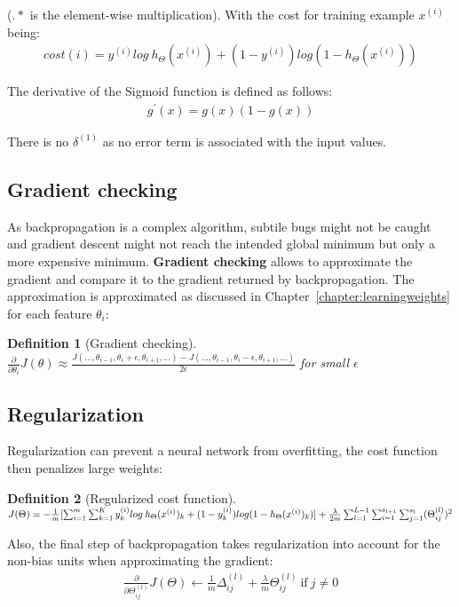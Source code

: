 \documentclass{report}
\newtheorem{definition}{Definition}[section]
\begin{document}
($.*$ is the element-wise multiplication). With the cost for training example $x^{(i)}$ being:
\begin{align*}
cost(i) = y^{(i)}log\:h_{\Theta}(x^{(i)})+(1-y^{(i)})log(1-h_{\Theta}(x^{(i)}))
\end{align*}

The derivative of the Sigmoid function is defined as follows:
\begin{align*}
g^{'}(x)=g(x)(1-g(x))
\end{align*}

There is no $\delta^{(1)}$ as no error term is associated with the input values.


\subsection{Gradient checking}
As backpropagation is a complex algorithm, subtile bugs might not be caught and gradient descent might not reach the intended global minimum but only a more expensive minimum.
{\bf Gradient checking} allows to approximate the gradient and compare it to the gradient returned by backpropagation.
The approximation is approximated as discussed in Chapter~\ref{chapter:learningweights} for each feature $\theta_i$:
\begin{definition}[Gradient checking] ~\\
$\frac{\partial}{\partial\theta_i}J(\theta)\approx\frac{J(...,\theta_{i-1},\theta_{i}+\epsilon,\theta_{i+1},...)-J(...,\theta_{i-1},\theta_{i}-\epsilon,\theta_{i+1},...)}{2\epsilon}$ for small $\epsilon$
\end{definition}

\subsection{Regularization}
Regularization can prevent a neural network from overfitting, the cost function then penalizes large weights:

\begin{definition}[Regularized cost function] ~\\
$J(\Theta) = -\frac{1}{m}[\sum_{i=1}^m \sum_{k=1}^K y_k^{(i)}log\:h_{\Theta}(x^{(i)})_k+(1-y_k^{(i)})log(1-h_{\Theta}(x^{(i)})_k)] \\
+ \frac{\lambda}{2m}\sum_{l=1}^{L-1}\sum_{i=1}^{s_{l+1}}\sum_{j=1}^{s_{l}}(\Theta_{ij}^{(l)})^2$
\end{definition}

Also, the final step of backpropagation takes regularization into account for the non-bias units when approximating the gradient:
\begin{align*}
\frac{\partial}{\partial \Theta_{ij}^{(l)}}J(\Theta) \gets \frac{1}{m}\Delta_{ij}^{(l)}+\frac{\lambda}{m}\Theta_{ij}^{(l)}\:\mbox{if}\:j\ne0
\end{align*}
\end{document}
